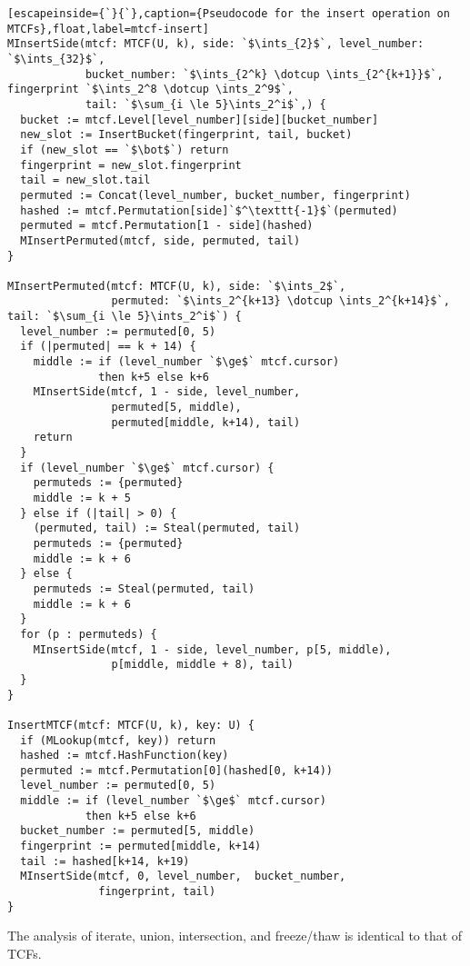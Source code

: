 \documentclass[sigconf]{acmart}
\newcommand{\ints}{\mathbb{Z}}
\newcommand{\dotcup}{\ensuremath{\mathaccent\cdot\cup}}
\begin{document}
\begin{lstlisting}[escapeinside={`}{`},caption={Pseudocode for the insert operation on MTCFs},float,label=mtcf-insert]
MInsertSide(mtcf: MTCF(U, k), side: `$\ints_{2}$`, level_number: `$\ints_{32}$`,
            bucket_number: `$\ints_{2^k} \dotcup \ints_{2^{k+1}}$`, fingerprint `$\ints_2^8 \dotcup \ints_2^9$`,
            tail: `$\sum_{i \le 5}\ints_2^i$`,) {
  bucket := mtcf.Level[level_number][side][bucket_number]
  new_slot := InsertBucket(fingerprint, tail, bucket)
  if (new_slot == `$\bot$`) return
  fingerprint = new_slot.fingerprint
  tail = new_slot.tail
  permuted := Concat(level_number, bucket_number, fingerprint)
  hashed := mtcf.Permutation[side]`$^\texttt{-1}$`(permuted)
  permuted = mtcf.Permutation[1 - side](hashed)
  MInsertPermuted(mtcf, side, permuted, tail)
}

MInsertPermuted(mtcf: MTCF(U, k), side: `$\ints_2$`,
                permuted: `$\ints_2^{k+13} \dotcup \ints_2^{k+14}$`, tail: `$\sum_{i \le 5}\ints_2^i$`) {
  level_number := permuted[0, 5)
  if (|permuted| == k + 14) {
    middle := if (level_number `$\ge$` mtcf.cursor)
              then k+5 else k+6
    MInsertSide(mtcf, 1 - side, level_number,
                permuted[5, middle),
                permuted[middle, k+14), tail)
    return
  }
  if (level_number `$\ge$` mtcf.cursor) {
    permuteds := {permuted}
    middle := k + 5
  } else if (|tail| > 0) {
    (permuted, tail) := Steal(permuted, tail)
    permuteds := {permuted}
    middle := k + 6
  } else {
    permuteds := Steal(permuted, tail)
    middle := k + 6
  }
  for (p : permuteds) {
    MInsertSide(mtcf, 1 - side, level_number, p[5, middle),
                p[middle, middle + 8), tail)
  }
}

InsertMTCF(mtcf: MTCF(U, k), key: U) {
  if (MLookup(mtcf, key)) return
  hashed := mtcf.HashFunction(key)
  permuted := mtcf.Permutation[0](hashed[0, k+14))
  level_number := permuted[0, 5)
  middle := if (level_number `$\ge$` mtcf.cursor)
            then k+5 else k+6
  bucket_number := permuted[5, middle)
  fingerprint := permuted[middle, k+14)
  tail := hashed[k+14, k+19)
  MInsertSide(mtcf, 0, level_number,  bucket_number,
              fingerprint, tail)
}
\end{lstlisting}

The analysis of iterate, union, intersection, and freeze/thaw is identical to that of TCFs.

\end{document}

